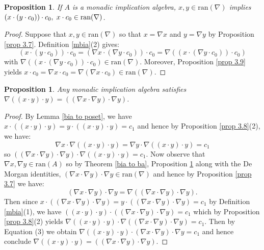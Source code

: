 \documentclass[reqno]{amsart}
\theoremstyle{plain}
\newtheorem{proposition}[theorem]{Proposition}
\theoremstyle{definition}
\begin{document}
\begin{proposition}\label{prop 3.10}
   If $A$ is a monadic implication algebra, $x,y\in\text{ran}(\nabla)$ implies $(x\cdot(y\cdot c_0))\cdot c_0,\hspace{.1cm} x\cdot c_0\in\text{ran}(\nabla)$.  
\end{proposition}
\begin{proof}
    Suppose that $x,y\in\text{ran}(\nabla)$ so that $x=\nabla x$ and $y=\nabla y$ by Proposition \ref{prop 3.7}. Definition \ref{mbia}(2) gives:
    \[(x\cdot(y\cdot c_0))\cdot c_0=(\nabla x\cdot(\nabla y\cdot c_0))\cdot c_0=\nabla((x\cdot(\nabla y\cdot c_0))\cdot c_0)\] with $\nabla((x\cdot(\nabla y\cdot c_0))\cdot c_0)\in\text{ran}(\nabla)$. Moreover, Proposition \ref{prop 3.9} yields $x\cdot c_0=\nabla x\cdot c_0=\nabla(\nabla x\cdot c_0)\in\text{ran}(\nabla)$.  
\end{proof}
\begin{proposition}\label{preservation of joins}
    Any monadic implication algebra satisfies $\nabla((x\cdot y)\cdot y)=((\nabla x\cdot\nabla y)\cdot\nabla y)$.  
\end{proposition}
\begin{proof}
    By Lemma \ref{bia to poset}, we have $x\cdot((x\cdot y)\cdot y)=y\cdot((x\cdot y)\cdot y)=c_1$ and hence by Proposition \ref{prop 3.8}(2), we have: \[\nabla x\cdot\nabla((x\cdot y)\cdot y)=\nabla y\cdot\nabla((x\cdot y)\cdot y)=c_1\] so $((\nabla x\cdot\nabla y)\cdot\nabla y)\cdot\nabla((x\cdot y)\cdot y)=c_1$. Now observe that $\nabla x,\nabla y\in\text{ran}(A)$ so by Theorem \ref{bia to ba}, Proposition \ref{prop 3.10} along with the De Morgan identities, $(\nabla x\cdot\nabla y)\cdot\nabla y\in\text{ran}(\nabla)$ and hence by Proposition \ref{prop 3.7} we have:
    \begin{equation}
        (\nabla x\cdot\nabla y)\cdot\nabla y=\nabla((\nabla x\cdot\nabla y)\cdot\nabla y).
    \end{equation}
     Then since $x\cdot((\nabla x\cdot\nabla y)\cdot\nabla y)=y\cdot((\nabla x\cdot\nabla y)\cdot\nabla y)=c_1$ by Definition \ref{mbia}(1), we have $((x\cdot y)\cdot y)\cdot((\nabla x\cdot\nabla y)\cdot\nabla y)=c_1$ which by Proposition \ref{prop 3.8}(2) yields $\nabla((x\cdot y)\cdot y)\cdot\nabla((\nabla x\cdot\nabla y)\cdot\nabla y)=c_1$. Then by Equation (3) we obtain $\nabla((x\cdot y)\cdot y)\cdot(\nabla x\cdot\nabla y)\cdot\nabla y=c_1$ and hence conclude $\nabla((x\cdot y)\cdot y)=((\nabla x\cdot\nabla y)\cdot\nabla y)$.  
\end{proof}
\end{document}
